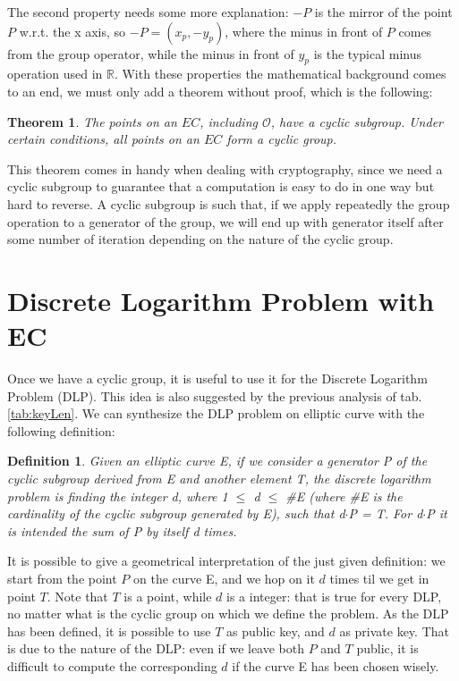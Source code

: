 \documentclass{article}
\newtheorem*{remark}{Theorem}
\newtheorem*{definition}{Definition}
\begin{document}
The second property needs some more explanation: $-P$ is the mirror of the point $P$ w.r.t. the x axis, so $-P = (x_p, -y_p)$, where the minus in front of $P$ comes from the group operator, while the minus in front of $y_p$ is the typical minus operation used in $\mathbb{R}$. With these properties the mathematical background comes to an end, we must only add a theorem without proof, which is the following:

\begin{remark}
	The points on an $EC$, including $\mathcal{O}$, have a cyclic subgroup. Under certain conditions, all points on an $EC$ form a cyclic group.
\end{remark} 

This theorem comes in handy when dealing with cryptography, since we need a cyclic subgroup to guarantee that a computation is easy to do in one way but hard to reverse. A cyclic subgroup is such that, if we apply repeatedly the group operation to a generator of the group, we will end up with generator itself after some number of iteration depending on the nature of the cyclic group.


\section{Discrete Logarithm Problem with EC}

Once we have a cyclic group, it is useful to use it for the Discrete Logarithm Problem (DLP). This idea is also suggested by the previous analysis of tab. \ref{tab:keyLen}.\newline
We can synthesize the DLP problem on elliptic curve with the following definition:

\begin{definition}
	Given an elliptic curve E, if we consider a generator P of the cyclic subgroup derived from E and another element T, the discrete logarithm problem is finding the integer d, where 1 $\leq$ d $\leq$ \#E (where \#E is the cardinality of the cyclic subgroup generated by E), such that d$\cdot$P = T. For d$\cdot$P it is intended the sum of P by itself d times.
\end{definition}

It is possible to give a geometrical interpretation of the just given definition: we start from the point $P$ on the curve E, and we hop on it $d$ times til we get in point $T$. Note that $T$ is a point, while $d$ is a integer: that is true for every DLP, no matter what is the cyclic group on which we define the problem. As the DLP has been defined, it is possible to use $T$ as public key, and $d$ as private key. That is due to the nature of the DLP: even if we leave both $P$ and $T$ public, it is difficult to compute the corresponding $d$ if the curve E has been chosen wisely.
\end{document}
